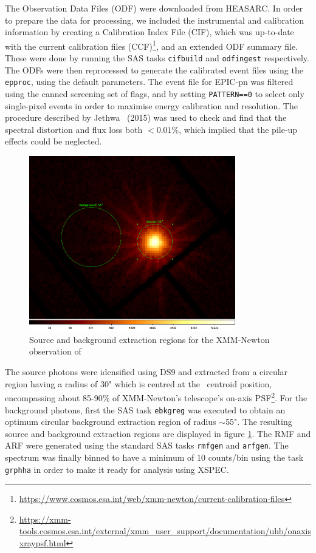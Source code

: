 	    	The Observation Data Files (ODF) were downloaded from HEASARC. In order to prepare the data for processing, we included the instrumental and calibration information by creating a Calibration Index File (CIF), which was up-to-date with the current calibration files (CCF)\footnote{\url{https://www.cosmos.esa.int/web/xmm-newton/current-calibration-files}}, and an extended ODF summary file. These were done by running the SAS tasks \texttt{cifbuild} and \texttt{odfingest} respectively. The ODFs were then reprocessed to generate the calibrated event files using the \texttt{epproc}, using the default parameters. The event file for EPIC-pn was filtered using the canned screening set of flags, and by setting \texttt{PATTERN==0} to select only single-pixel events in order to maximise energy calibration and resolution. The procedure described by Jethwa \etal\ (2015) \cite{jethwa2015pile} was used to check and find that the spectral distortion and flux loss both $<0.01\%$, which implied that the pile-up effects could be neglected.
	    	\begin{figure}[!htb]
		        \centering
		        \includegraphics[width=0.8\textwidth]{images/rx-j0925-7-4758_0111150101_src-bkg.png}
		        \caption{Source and background extraction regions for the XMM-Newton observation of \source}
		        \label{fig:src-bkg:pn}
		    \end{figure}
		    
		    The source photons were idensified using DS9 and extracted from a circular region having a radius of 30" which is centred at the \source\ centroid position, encompassing about 85-90\% of XMM-Newton's telescope's on-axis PSF\footnote{\url{https://xmm-tools.cosmos.esa.int/external/xmm_user_support/documentation/uhb/onaxisxraypsf.html}}. For the background photons, first the SAS task \texttt{ebkgreg} was executed to obtain an optimum circular background extraction region of radius $\sim$55". The resulting source and background extraction regions are displayed in figure \ref{fig:src-bkg:pn}. The RMF and ARF were generated using the standard SAS tasks \texttt{rmfgen} and \texttt{arfgen}. The spectrum was finally binned to have a minimum of 10 counts/bin using the task \texttt{grphha} in order to make it ready for analysis using XSPEC.

